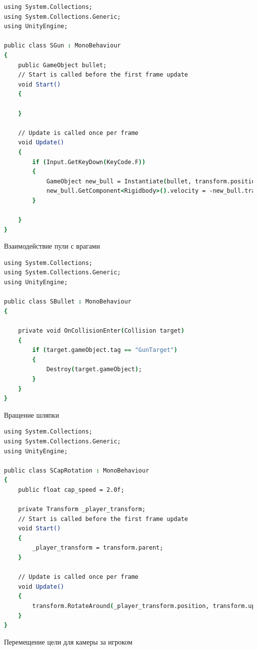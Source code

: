 \begin{lstlisting}[language=csh]
using System.Collections;
using System.Collections.Generic;
using UnityEngine;

public class SGun : MonoBehaviour
{
    public GameObject bullet;
    // Start is called before the first frame update
    void Start()
    {
        
    }

    // Update is called once per frame
    void Update()
    {
        if (Input.GetKeyDown(KeyCode.F))
        {
            GameObject new_bull = Instantiate(bullet, transform.position + new Vector3(0.5f, 0.1f, 0.0f), transform.rotation);
            new_bull.GetComponent<Rigidbody>().velocity = -new_bull.transform.right * 30.0f;
        }

    }
}
\end{lstlisting}

 Взаимодействие пули с врагами

\begin{lstlisting}[language=csh]
using System.Collections;
using System.Collections.Generic;
using UnityEngine;

public class SBullet : MonoBehaviour
{

    private void OnCollisionEnter(Collision target)
    {
        if (target.gameObject.tag == "GunTarget")
        {
            Destroy(target.gameObject);
        }
    }
}

\end{lstlisting}

 Вращение шляпки

\begin{lstlisting}[language=csh]
using System.Collections;
using System.Collections.Generic;
using UnityEngine;

public class SCapRotation : MonoBehaviour
{
    public float cap_speed = 2.0f;

    private Transform _player_transform;
    // Start is called before the first frame update
    void Start()
    {
        _player_transform = transform.parent;
    }

    // Update is called once per frame
    void Update()
    {
        transform.RotateAround(_player_transform.position, transform.up, cap_speed);
    }
}
\end{lstlisting}

 Перемещение цели для камеры за игроком

